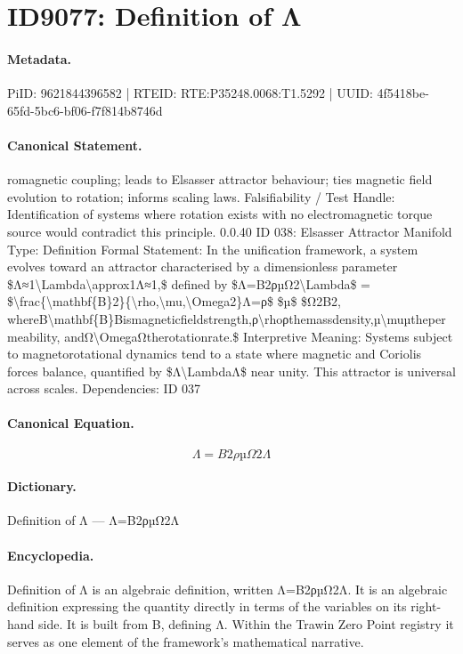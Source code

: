 \section*{ID9077: Definition of Λ}
\paragraph{Metadata.}
PiID: 9621844396582 | RTEID: RTE:P35248.0068:T1.5292 | UUID: 4f5418be-65fd-5bc6-bf06-f7f814b8746d

\paragraph{Canonical Statement.}
romagnetic coupling; leads to Elsasser attractor behaviour; ties magnetic field evolution to rotation; informs scaling laws. Falsifiability / Test Handle: Identification of systems where rotation exists with no electromagnetic torque source would contradict this principle. 0.0.40 ID 038: Elsasser Attractor Manifold Type: Definition Formal Statement: In the unification framework, a system evolves toward an attractor characterised by a dimensionless parameter \$Λ≈1\textbackslash{}Lambda\textbackslash{}approx1Λ≈1,\$ defined by \$Λ=B2ρµΩ2\textbackslash{}Lambda\$ = \$\textbackslash{}frac\{\textbackslash{}mathbf\{B\}2\}\{\textbackslash{}rho,\textbackslash{}mu,\textbackslash{}Omega2\}Λ=ρ\$ \$µ\$ \$Ω2B2, whereB\textbackslash{}mathbf\{B\}Bismagneticfieldstrength,ρ\textbackslash{}rhoρthemassdensity,µ\textbackslash{}muµthepermeability, andΩ\textbackslash{}OmegaΩtherotationrate.\$ Interpretive Meaning: Systems subject to magnetorotational dynamics tend to a state where magnetic and Coriolis forces balance, quantified by \$Λ\textbackslash{}LambdaΛ\$ near unity. This attractor is universal across scales. Dependencies: ID 037

\paragraph{Canonical Equation.}
\[
Λ=B2ρµΩ2\Lambda
\]

\paragraph{Dictionary.}
Definition of Λ — Λ=B2ρµΩ2Λ

\paragraph{Encyclopedia.}
Definition of Λ is an algebraic definition, written Λ=B2ρµΩ2Λ. It is an algebraic definition expressing the quantity directly in terms of the variables on its right-hand side. It is built from B, defining Λ. Within the Trawin Zero Point registry it serves as one element of the framework's mathematical narrative.
